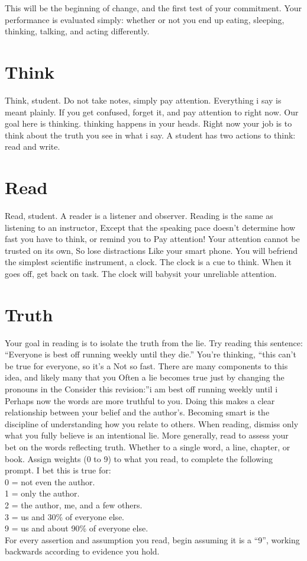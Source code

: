 \documentclass[
]{book}
\begin{document}
This will be the beginning of change, and the first test of your commitment.
Your performance is evaluated simply: whether or not you
end up eating, sleeping, thinking, talking, and acting differently.

\section{Think}\label{think}

Think, student.
Do not take notes, simply pay attention.
Everything i say is meant plainly.
If you get confused, forget it, and pay attention to right now.
Our goal here is thinking. thinking happens in your heads.
Right now your job is to think about the truth you see in what i say.
A student has two actions to think: read and write.

\section{Read}\label{read}

Read, student.
A reader is a listener and observer.
Reading is the same as listening to an instructor,
Except that the speaking pace doesn't determine how fast you have to think, or remind you to
Pay attention!
Your attention cannot be trusted on its own,
So lose distractions
Like your smart phone.
You will befriend the simplest scientific instrument, a clock.
The clock is a cue to think.
When it goes off, get back on task.
The clock will babysit your unreliable attention.

\section{Truth}\label{truth}

Your goal in reading is to isolate the truth from the lie.
Try reading this sentence:
``Everyone is best off running weekly until they die.''
You're thinking, ``this can't be true for everyone, so it's a
Not so fast.
There are many components to this idea, and likely many that you
Often a lie becomes true just by changing the pronouns in the
Consider this revision:''i am best off running weekly until i
Perhaps now the words are more truthful to you.
Doing this makes a clear relationship between your belief and the author's.
Becoming smart is the discipline of understanding how you relate to others.
When reading, dismiss only what you fully believe is an intentional lie.
More generally, read to assess your bet on the words reflecting truth.
Whether to a single word, a line, chapter, or book.
Assign weights (0 to 9) to what you read, to complete the following prompt.
I bet this is true for:\\
0 = not even the author.\\
1 = only the author.\\
2 = the author, me, and a few others.\\
3 = us and 30\% of everyone else.\\
9 = us and about 90\% of everyone else.\\
For every assertion and assumption you read, begin assuming it is a ``9'', working backwards according to evidence you hold.
\end{document}
